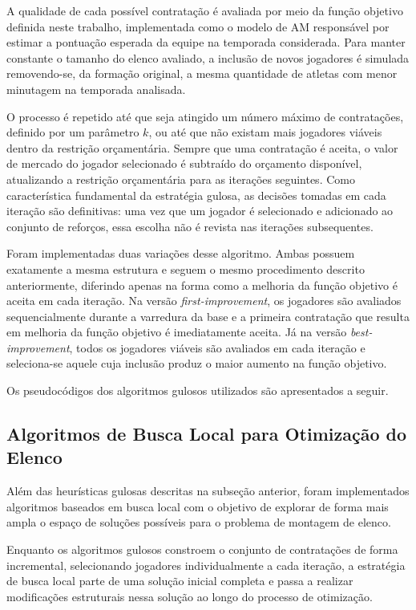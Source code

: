 A qualidade de cada possível contratação é avaliada por meio da função objetivo definida neste trabalho, implementada como o modelo de AM responsável 
por estimar a pontuação esperada da equipe na temporada considerada. Para manter constante o tamanho do elenco avaliado, a inclusão de novos jogadores 
é simulada removendo-se, da formação original, a mesma quantidade de atletas com menor minutagem na temporada analisada.

O processo é repetido até que seja atingido um número máximo de contratações, definido por um parâmetro \(k\), ou até que não existam mais jogadores 
viáveis dentro da restrição orçamentária. Sempre que uma contratação é aceita, o valor de mercado do jogador selecionado é subtraído do orçamento disponível, 
atualizando a restrição orçamentária para as iterações seguintes. Como característica fundamental da estratégia gulosa, as decisões tomadas em cada 
iteração são definitivas: uma vez que um jogador é selecionado e adicionado ao conjunto de reforços, essa escolha não é revista nas iterações subsequentes.

Foram implementadas duas variações desse algoritmo. Ambas possuem exatamente a mesma estrutura e seguem o mesmo procedimento descrito anteriormente, 
diferindo apenas na forma como a melhoria da função objetivo é aceita em cada iteração. Na versão \textit{first-improvement}, os jogadores são avaliados 
sequencialmente durante a varredura da base e a primeira contratação que resulta em melhoria da função objetivo é imediatamente aceita. 
Já na versão \textit{best-improvement}, todos os jogadores viáveis são avaliados em cada iteração e seleciona-se aquele cuja inclusão 
produz o maior aumento na função objetivo.

Os pseudocódigos dos algoritmos gulosos utilizados são apresentados a seguir.



\FloatBarrier

\subsection{Algoritmos de Busca Local para Otimização do Elenco}

Além das heurísticas gulosas descritas na subseção anterior, foram implementados algoritmos baseados em busca local com o objetivo de explorar de 
forma mais ampla o espaço de soluções possíveis para o problema de montagem de elenco.

Enquanto os algoritmos gulosos constroem o conjunto de contratações de forma incremental, selecionando jogadores individualmente a cada iteração, 
a estratégia de busca local parte de uma solução inicial completa e passa a realizar modificações estruturais nessa solução ao longo do processo de otimização.

